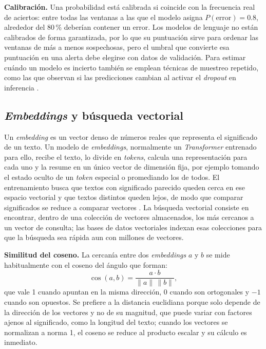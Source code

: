 \textbf{Calibración.} Una probabilidad está calibrada si coincide con la frecuencia real de aciertos: entre todas las ventanas a las que el modelo asigna $P(\text{error}) = 0.8$, alrededor del 80\,\% deberían contener un error. Los modelos de lenguaje no están calibrados de forma garantizada, por lo que su puntuación sirve para ordenar las ventanas de más a menos sospechosas, pero el umbral que convierte esa puntuación en una alerta debe elegirse con datos de validación. Para estimar cuándo un modelo es incierto también se emplean técnicas de muestreo repetido, como las que observan si las predicciones cambian al activar el \textit{dropout} en inferencia \cite{ma2026_adaptivelog}.

\subsection{\textit{Embeddings} y búsqueda vectorial}\label{sec:mt_embeddings}

Un \textit{embedding} es un vector denso de números reales que representa el significado de un texto. Un modelo de \textit{embeddings}, normalmente un \textit{Transformer} entrenado para ello, recibe el texto, lo divide en \textit{tokens}, calcula una representación para cada uno y la resume en un único vector de dimensión fija, por ejemplo tomando el estado oculto de un \textit{token} especial o promediando los de todos. El entrenamiento busca que textos con significado parecido queden cerca en ese espacio vectorial y que textos distintos queden lejos, de modo que comparar significados se reduce a comparar vectores \cite{murphy2024_embeddings}. La búsqueda vectorial consiste en encontrar, dentro de una colección de vectores almacenados, los más cercanos a un vector de consulta; las bases de datos vectoriales indexan esas colecciones para que la búsqueda sea rápida aun con millones de vectores.

\textbf{Similitud del coseno.} La cercanía entre dos \textit{embeddings} $a$ y $b$ se mide habitualmente con el coseno del ángulo que forman:
\begin{equation}
\cos(a, b) = \frac{a \cdot b}{\lVert a \rVert \, \lVert b \rVert},
\end{equation}
que vale 1 cuando apuntan en la misma dirección, 0 cuando son ortogonales y $-1$ cuando son opuestos. Se prefiere a la distancia euclidiana porque solo depende de la dirección de los vectores y no de su magnitud, que puede variar con factores ajenos al significado, como la longitud del texto; cuando los vectores se normalizan a norma 1, el coseno se reduce al producto escalar y su cálculo es inmediato.


